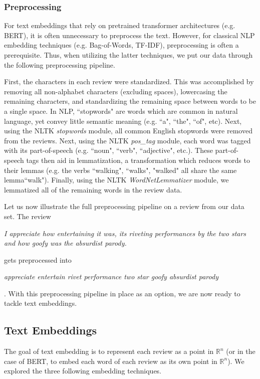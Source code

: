 \documentclass[fleqn,10pt]{SelfArx}
\begin{document}
\subsubsection{Preprocessing}
For text embeddings that rely on pretrained transformer architectures (e.g. BERT), it is often unnecessary to preprocess the text. However, for classical NLP embedding techniques (e.g. Bag-of-Words, TF-IDF), preprocessing is often a prerequisite. Thus, when utilizing the latter techniques, we put our data through the following preprocessing pipeline. 

First, the characters in each review were standardized. This was accomplished by removing all non-alphabet characters (excluding spaces), lowercasing the remaining characters, and standardizing the remaining space between words to be a single space. In NLP, ``stopwords" are words which are common in natural language, yet convey little semantic meaning (e.g. ``a", ``the", ``of", etc). Next, using the NLTK \textit{stopwords} module, all common English stopwords were removed from the reviews. Next, using the NLTK \textit{pos\_tag} module, each word was tagged with its part-of-speech (e.g. ``noun", ``verb", ``adjective", etc.). These part-of-speech tags then aid in lemmatization, a transformation which reduces words to their lemmas (e.g. the verbs ``walking", ``walks", "walked" all share the same lemma``walk"). Finally, using the NLTK \textit{WordNetLemmatizer} module, we lemmatized all of the remaining words in the review data.

Let us now illustrate the full preprocessing pipeline on a review from our data set. The review 

\vspace{0.1cm}
\textit{I appreciate how entertaining it was, its riveting performances by the two stars and how goofy was the absurdist parody.}

\vspace{0.1cm}
gets preprocessed into

\vspace{0.1cm}
\textit{appreciate entertain rivet performance two star goofy absurdist parody}

\vspace{0.1cm}
. With this preprocessing pipeline in place as an option, we are now ready to tackle text embeddings. 

\subsection{Text Embeddings}
The goal of text embedding is to represent each review as a point in $\mathbb{R}^n$ (or in the case of BERT, to embed each word of each review as its own point in $\mathbb{R}^n$). We explored the three following embedding techniques. 
\end{document}
